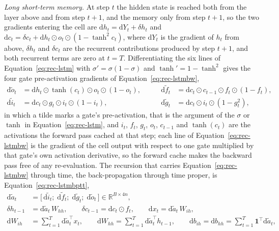 \emph{Long short-term memory.} At step $t$ the hidden state is reached both from the layer above and from step $t+1$, and the memory only from step $t+1$, so the two gradients entering the cell are $\mathrm dh_t=\mathrm dY_t+\delta h_t$ and $\mathrm dc_t=\delta c_t+\mathrm dh_t\odot o_t\odot(1-\tanh^2c_t)$, where $\mathrm dY_t$ is the gradient of $h_t$ from above, $\delta h_t$ and $\delta c_t$ are the recurrent contributions produced by step $t+1$, and both recurrent terms are zero at $t=T$.
Differentiating the six lines of Equation~\ref{eq:rec-lstm} with $\sigma'=\sigma(1-\sigma)$ and $\tanh'=1-\tanh^2$ gives the four gate pre-activation gradients of Equation~\ref{eq:rec-lstmbw},
\begin{equation}
\begin{aligned}
\mathrm d\tilde o_t&=\mathrm dh_t\odot\tanh(c_t)\odot o_t\odot(1-o_t), &\qquad \mathrm d\tilde f_t&=\mathrm dc_t\odot c_{t-1}\odot f_t\odot(1-f_t),\\
\mathrm d\tilde i_t&=\mathrm dc_t\odot g_t\odot i_t\odot(1-i_t), &\qquad \mathrm d\tilde g_t&=\mathrm dc_t\odot i_t\odot(1-g_t^2),
\end{aligned}
\label{eq:rec-lstmbw}
\end{equation}
in which a tilde marks a gate's pre-activation, that is the argument of the $\sigma$ or $\tanh$ in Equation~\ref{eq:rec-lstm}, and $i_t$, $f_t$, $g_t$, $o_t$, $c_{t-1}$ and $\tanh(c_t)$ are the activations the forward pass cached at that step; each line of Equation~\ref{eq:rec-lstmbw} is the gradient of the cell output with respect to one gate multiplied by that gate's own activation derivative, so the forward cache makes the backward pass free of any re-evaluation.
The recursion that carries Equation~\ref{eq:rec-lstmbw} through time, the back-propagation through time proper, is Equation~\ref{eq:rec-lstmbptt},
\begin{equation}
\begin{aligned}
\mathrm d\tilde a_t&=\bigl[\,\mathrm d\tilde i_t;\;\mathrm d\tilde f_t;\;\mathrm d\tilde g_t;\;\mathrm d\tilde o_t\,\bigr]\in\mathbb R^{B\times4n},\\
\delta h_{t-1}&=\mathrm d\tilde a_t\,W_{hh},\qquad \delta c_{t-1}=\mathrm dc_t\odot f_t,\qquad \mathrm dx_t=\mathrm d\tilde a_t\,W_{ih},\\
\mathrm dW_{ih}&=\sum_{t=1}^{T}\mathrm d\tilde a_t^{\top}x_t,\qquad \mathrm dW_{hh}=\sum_{t=1}^{T}\mathrm d\tilde a_t^{\top}h_{t-1},\qquad \mathrm db_{ih}=\mathrm db_{hh}=\sum_{t=1}^{T}\mathbf 1^{\top}\mathrm d\tilde a_t,
\end{aligned}
\label{eq:rec-lstmbptt}
\end{equation}
